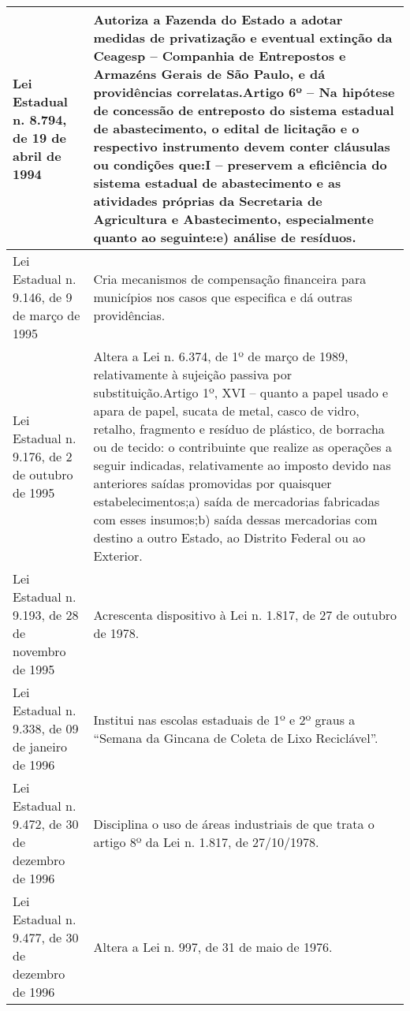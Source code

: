 \begin{center}
\begin{longtable}{|p{}|p{}|}
			\hline
			Lei Estadual n. 8.794, de 19 de abril de 1994 & Autoriza  a  Fazenda  do  Estado  a  adotar  medidas  de  privatização  e  eventual extinção da Ceagesp – Companhia de Entrepostos e Armazéns Gerais de São Paulo, e dá providências correlatas.\newline{}Artigo  6º  –  Na  hipótese  de  concessão  de  entreposto  do  sistema  estadual  de abastecimento,  o  edital  de  licitação  e  o  respectivo  instrumento  devem  conter cláusulas ou condições que:\newline{}I – preservem a eficiência do sistema estadual de abastecimento e as atividades próprias da Secretaria de Agricultura e Abastecimento, especialmente quanto ao seguinte:\newline{}e) análise de resíduos. \\
			\hline
			Lei Estadual n. 9.146, de 9 de março de 1995 & Cria  mecanismos  de  compensação  financeira  para  municípios  nos  casos  que especifica e dá outras providências. \\
			\hline
			Lei Estadual n. 9.176, de 2 de outubro de 1995 & Altera a Lei n. 6.374, de 1º de março de 1989, relativamente à sujeição passiva por substituição.\newline{}Artigo 1º, XVI – quanto a papel usado e apara de papel, sucata de metal, casco de vidro, retalho, fragmento e resíduo de plástico, de borracha ou de tecido: o contribuinte  que  realize  as  operações  a  seguir  indicadas,  relativamente  ao imposto     devido     nas     anteriores     saídas     promovidas     por     quaisquer estabelecimentos;\newline{}a) saída de mercadorias fabricadas com esses insumos;\newline{}b) saída dessas mercadorias com destino a outro Estado, ao Distrito Federal ou ao Exterior. \\
			\hline
			Lei Estadual n. 9.193, de 28 de novembro de 1995 & Acrescenta dispositivo à Lei n. 1.817, de 27 de outubro de 1978. \\
			\hline
			Lei Estadual n. 9.338, de 09 de janeiro de 1996 & Institui nas escolas estaduais de 1º e 2º graus a “Semana da Gincana de Coleta de Lixo Reciclável”. \\
			\hline
			Lei Estadual n. 9.472, de 30 de dezembro de 1996 & Disciplina o uso de áreas industriais de que trata o artigo 8º da Lei n. 1.817, de 27/10/1978. \\
			\hline
			Lei Estadual n. 9.477, de 30 de dezembro de 1996 & Altera a Lei n. 997, de 31 de maio de 1976. \\

\end{longtable}
\end{center}
